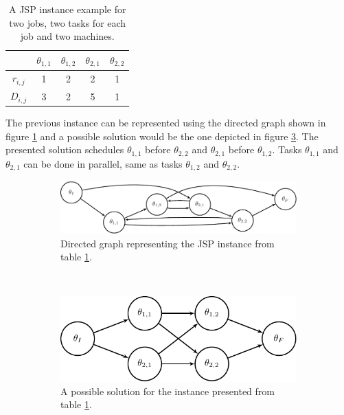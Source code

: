 \documentclass[10pt,a4paper]{article}
\begin{document}
\begin{table}[h]
\centering
\begin{tabular}{|c|c|c|c|c|}
\hline 
& $\theta_{1,1}$ & $\theta_{1,2}$ & $\theta_{2,1}$ & $\theta_{2,2}$ \\
\hline
$r_{i,j}$ & 1 & 2 & 2 & 1 \\
$D_{i,j}$ & 3 & 2 & 5 & 1 \\
\hline
\end{tabular}
\caption{A JSP instance example for two jobs, two tasks for each job and two machines.}
\label{tab:example_instance}
\end{table}

The previous instance can be represented using the directed graph shown in figure \ref{fig:example_instance} and a possible solution would be the one depicted in figure \ref{fig:example_instance_sol}. The presented solution schedules $\theta_{1,1}$ before $\theta_{2,2}$ and $\theta_{2,1}$ before $\theta_{1,2}$. Tasks $\theta_{1,1}$ and $\theta_{2,1}$ can be done in parallel, same as tasks $\theta_{1,2}$ and $\theta_{2,2}$.\\

\begin{figure}[h]
\centering
\begin{subfigure}[b]{0.48\textwidth}
\centering
\includegraphics[width=\textwidth]{example_instance.pdf}
\caption{Directed graph representing the JSP instance from table \ref{tab:example_instance}.}
\label{fig:example_instance}
\end{subfigure}
~
\begin{subfigure}[b]{0.48\textwidth}
\centering
\includegraphics[width=\textwidth]{example_instance_sol.pdf}
\caption{A possible solution for the instance presented from table \ref{tab:example_instance}. }
\label{fig:example_instance_sol}
\end{subfigure}
\caption{}
\end{figure}
\end{document}
